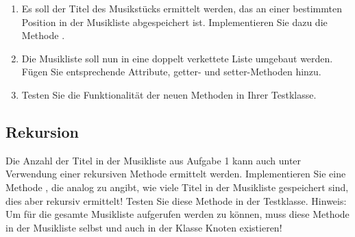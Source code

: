 \documentclass{lehramt-informatik-aufgabe}
\begin{document}
\begin{enumerate}
%

\item Es soll der Titel des Musikstücks ermittelt werden, das an einer
bestimmten Position in der Musikliste abgespeichert ist. Implementieren
Sie dazu die Methode .

\begin{liAntwort}
\end{liAntwort}

%

\item Die Musikliste soll nun in eine doppelt verkettete Liste umgebaut
werden. Fügen Sie entsprechende Attribute, getter- und setter-Methoden
hinzu.

\begin{liAntwort}
\end{liAntwort}

%

\item Testen Sie die Funktionalität der neuen Methoden in Ihrer
Testklasse.

\begin{liAntwort}
\end{liAntwort}

\end{enumerate}

\subsection{Rekursion}

Die Anzahl der Titel in der Musikliste aus Aufgabe 1 kann auch unter
Verwendung einer rekursiven Methode ermittelt werden. Implementieren Sie
eine Methode , die analog zu
 angibt, wie viele Titel in der Musikliste
gespeichert sind, dies aber rekursiv ermittelt! Testen Sie diese Methode
in der Testklasse. Hinweis: Um für die gesamte Musikliste aufgerufen
werden zu können, muss diese Methode in der Musikliste selbst und auch
in der Klasse Knoten existieren!

\begin{liAntwort}


\end{liAntwort}
\end{document}
